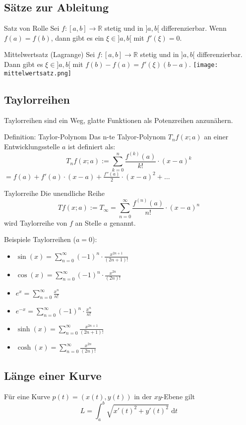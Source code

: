 \documentclass[a4paper,10pt]{article}
\def\sumn{\sum_{n=0}^\infty}
\def\R{\mathbb{R}}
\begin{document}
\subsection{Sätze zur Ableitung}
\begin{subbox}{Satz von Rolle}
 Sei $f: [a,b] \to \R$ stetig und in $]a,b[$ differenzierbar. Wenn $f(a) = f(b)$, dann gibt es ein $\xi \in ]a,b[$ mit $f'(\xi) = 0$.
\end{subbox}
\begin{mainbox}{Mittelwertsatz (Lagrange)}
 Sei $f: [a,b] \to \R$ stetig und in $]a,b[$ differenzierbar. Dann gibt es $\xi \in ]a,b[$ mit $f(b) - f(a) = f'(\xi)(b-a)$.
 \texttt{[image: mittelwertsatz.png]}
\end{mainbox}

\subsection{Taylorreihen}
Taylorreihen sind ein Weg, glatte Funktionen als Potenzreihen anzunähern.

\begin{subbox}{Definition: Taylor-Polynom}
 Das n-te Talyor-Polynom $T_n f(x; a)$ an einer Entwicklungsstelle $a$ ist definiert als:
 $$T_n f(x; a) := \sum_{k=0}^{n} \frac{f^{(k)} (a)}{k!} \cdot (x - a)^k$$ 
 $ = f(a) + f'(a) \cdot (x-a) + \frac{f''(a)}{2} \cdot (x - a)^2 + \ldots$
\end{subbox}

\begin{mainbox}{Taylorreihe}
 Die unendliche Reihe
 $$Tf(x;a) := T_\infty = \sumn \frac{f^{(n)}(a)}{n!} \cdot (x-a)^n$$
 wird Taylorreihe von $f$ an Stelle $a$ genannt.
\end{mainbox}
Beispiele Taylorreihen ($a = 0$):
\begin{itemize}
 \item $\sin(x) = \sumn (-1)^n \cdot \frac{x^{2n+1}}{(2n+1)!}$
 \item $\cos(x) = \sumn (-1)^n \cdot \frac{x^{2n}}{(2n)!}$
 \item $e^x = \sumn \frac{x^n}{n!}$
 \item $e^{-x} = \sumn (-1)^n \cdot \frac{x^n}{n!}$
 \item $\sinh(x) = \sumn \frac{x^{2n+1}}{(2n+1)!}$
 \item $\cosh(x) = \sumn \frac{x^{2n}}{(2n)!}$
\end{itemize}

\subsection{Länge einer Kurve}
Für eine Kurve $p(t) = (x(t), y(t))$ in der $xy$-Ebene gilt 
$$L = \int_a^b \sqrt{x'(t)^2+ y'(t)^2} \text{ d}t$$
\end{document}
